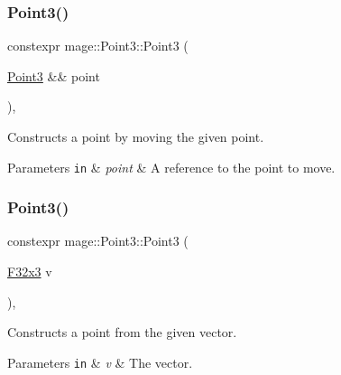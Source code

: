 \subsubsection{\texorpdfstring{Point3()}{Point3()}\hspace{0.1cm}{\footnotesize\ttfamily [4/5]}}
{\footnotesize\ttfamily constexpr mage\+::\+Point3\+::\+Point3 (\begin{DoxyParamCaption}\item[{\mbox{\hyperlink{structmage_1_1_point3}{Point3}} \&\&}]{point }\end{DoxyParamCaption})\hspace{0.3cm}{\ttfamily [default]}, {\ttfamily [noexcept]}}

Constructs a point by moving the given point.


\begin{DoxyParams}[1]{Parameters}
\mbox{\tt in}  & {\em point} & A reference to the point to move. \\
\hline
\end{DoxyParams}
\mbox{\label{structmage_1_1_point3_ae92569a8f17984726f2d0a15ef183aa5}} 
\subsubsection{\texorpdfstring{Point3()}{Point3()}\hspace{0.1cm}{\footnotesize\ttfamily [5/5]}}
{\footnotesize\ttfamily constexpr mage\+::\+Point3\+::\+Point3 (\begin{DoxyParamCaption}\item[{\mbox{\hyperlink{namespacemage_a0fef5ab4e073c2d9ea876fefa3da4233}{F32x3}}}]{v }\end{DoxyParamCaption})\hspace{0.3cm}{\ttfamily [explicit]}, {\ttfamily [noexcept]}}

Constructs a point from the given vector.


\begin{DoxyParams}[1]{Parameters}
\mbox{\tt in}  & {\em v} & The vector. \\
\hline
\end{DoxyParams}
\mbox{\label{structmage_1_1_point3_a952151b6ff72b68569f95445c2ac2495}} 
